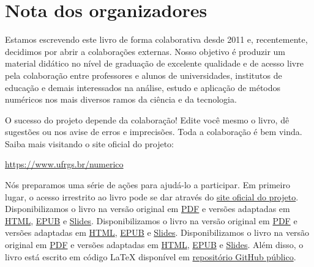 
\chapter*{Nota dos organizadores}

Estamos escrevendo este livro de forma colaborativa desde 2011 e, recentemente, decidimos por abrir a colaborações externas. Nosso objetivo é produzir um material didático no nível de graduação de excelente qualidade e de acesso livre pela colaboração entre professores e alunos de universidades, institutos de educação e demais interessados na análise, estudo e aplicação de métodos numéricos nos mais diversos ramos da ciência e da tecnologia.

O sucesso do projeto depende da colaboração! Edite você mesmo o livro, dê sugestões ou nos avise de erros e imprecisões. Toda a colaboração é bem vinda. Saiba mais visitando o site oficial do projeto:
\begin{center}
  \url{https://www.ufrgs.br/numerico}
\end{center}

Nós preparamos uma série de ações para ajudá-lo a participar. Em primeiro lugar, o acesso irrestrito ao livro pode se dar através do \href{https://www.ufrgs.br/numerico}{site oficial do projeto}.
\ifisscilab
Disponibilizamos o livro na versão original em \href{https://www.ufrgs.br/numerico/livro/main.pdf}{PDF} e versões adaptadas em \href{https://www.ufrgs.br/numerico/livro/main.html}{HTML}, \href{https://www.ufrgs.br/numerico/livro/main.epub}{EPUB} e \href{https://www.ufrgs.br/numerico/livro/slide.pdf}{Slides}.
\fi
\ifisoctave
Disponibilizamos o livro na versão original em \href{https://www.ufrgs.br/numerico/livro-oct/main-oct.pdf}{PDF} e versões adaptadas em \href{https://www.ufrgs.br/numerico/livro-oct/main.html}{HTML}, \href{https://www.ufrgs.br/numerico/livro-oct/main-oct.epub}{EPUB} e \href{https://www.ufrgs.br/numerico/livro-oct/slide-oct.pdf}{Slides}.
\fi
\ifispython
Disponibilizamos o livro na versão original em \href{https://www.ufrgs.br/numerico/livro-py/main-py.pdf}{PDF} e versões adaptadas em \href{https://www.ufrgs.br/numerico/livro-py/main.html}{HTML}, \href{https://www.ufrgs.br/numerico/livro-py/main-py.epub}{EPUB} e \href{https://www.ufrgs.br/numerico/livro-py/slide-py.pdf}{Slides}.
\fi
Além disso, o livro está escrito em código \LaTeX{} disponível em \href{https://github.com/livroscolaborativos/CalculoNumerico}{repositório GitHub público}.

